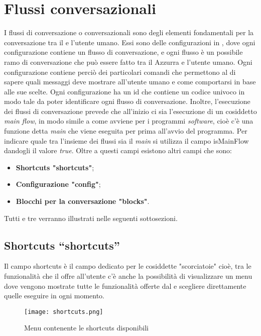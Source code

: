 \section{Flussi conversazionali}
I flussi di conversazione o conversazionali sono degli elementi fondamentali per la conversazione tra il  e l'utente umano. Essi sono delle configurazioni in , dove ogni configurazione contiene un flusso di conversazione, e ogni flusso è un possibile ramo di conversazione che può essere fatto tra il  Azzurra e l'utente umano. Ogni configurazione contiene perciò dei particolari comandi che permettono al  di sapere quali messaggi deve mostrare all'utente umano e come comportarsi in base alle sue scelte. Ogni configurazione ha un id che contiene un codice univoco in modo tale da poter identificare ogni flusso di conversazione. Inoltre, l'esecuzione dei flussi di conversazione prevede che all'inizio ci sia l'esecuzione di un cosiddetto \emph{main flow}, in modo simile a come avviene per i programmi \emph{software}, cioè c'è una funzione detta \emph{main} che viene eseguita per prima all'avvio del programma. Per indicare quale tra l'insieme dei flussi sia il \emph{main} si utilizza il campo isMainFlow dandogli il valore \emph{true}.
Oltre a questi campi esistono altri campi che sono:\\
\begin{itemize}
	\item \textbf{Shortcuts "shortcuts"};
	\item \textbf{Configurazione "config"};
	\item \textbf{Blocchi per la conversazione "blocks"}.
\end{itemize}
Tutti e tre verranno illustrati nelle seguenti sottosezioni.
\subsection{Shortcuts “shortcuts”}
Il campo shortcuts è il campo dedicato per le cosiddette "scorciatoie" cioè, tra le funzionalità che il  offre all'utente c'è anche la possibilità di visualizzare un menu dove vengono mostrate tutte le funzionalità offerte dal  e scegliere direttamente quelle eseguire in ogni momento.

\begin{figure}[htbp]
	\centering
	\texttt{[image: shortcuts.png]}
	\caption{Menu contenente le shortcuts disponibili}
\end{figure}

